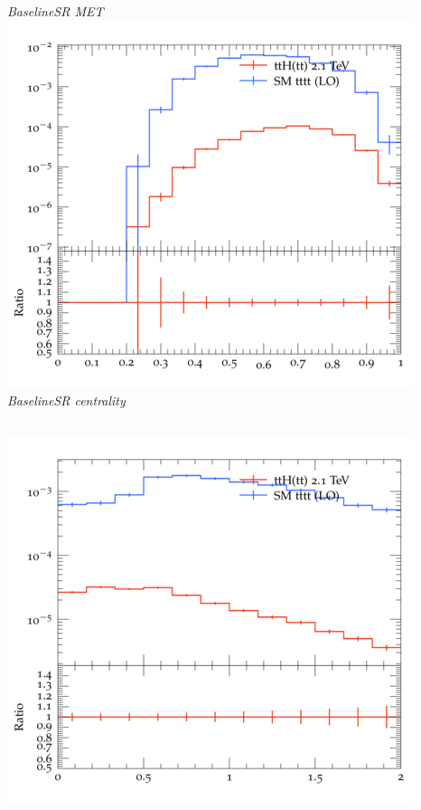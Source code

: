 \documentclass{beamer}
\begin{document}
\begin{frame}
\begin{columns}
\textit{\small BaselineSR MET}
\includegraphics[width=\textwidth]{../plots/ttH_2100/tttt_ttH_1LOS/BaselineSR_centrality.png}\\
\textit{\small BaselineSR centrality}
\end{columns}
\begin{columns}
\includegraphics[width=\textwidth]{../plots/ttH_2100/tttt_ttH_1LOS/BaselineSR_deltaR_bl_min.png}\\

\end{columns}
\end{frame}
\end{document}
